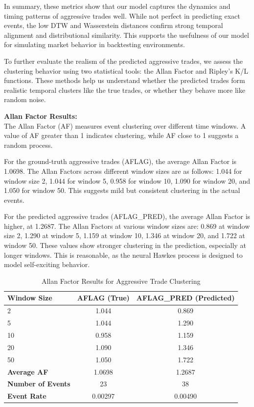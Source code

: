 In summary, these metrics show that our model captures the dynamics and timing patterns of aggressive trades well. While not perfect in predicting exact events, the low DTW and Wasserstein distances confirm strong temporal alignment and distributional similarity. This supports the usefulness of our model for simulating market behavior in backtesting environments.



To further evaluate the realism of the predicted aggressive trades, we assess the clustering behavior using two statistical tools: the Allan Factor and Ripley's K/L functions. These methods help us understand whether the predicted trades form realistic temporal clusters like the true trades, or whether they behave more like random noise.

\noindent\textbf{Allan Factor Results:} \\
The Allan Factor (AF) measures event clustering over different time windows. A value of AF greater than 1 indicates clustering, while AF close to 1 suggests a random process.

For the ground-truth aggressive trades (AFLAG), the average Allan Factor is 1.0698. The Allan Factors across different window sizes are as follows: 1.044 for window size 2, 1.044 for window 5, 0.958 for window 10, 1.090 for window 20, and 1.050 for window 50. This suggests mild but consistent clustering in the actual events.

For the predicted aggressive trades (AFLAG\_PRED), the average Allan Factor is higher, at 1.2687. The Allan Factors at various window sizes are: 0.869 at window size 2, 1.290 at window 5, 1.159 at window 10, 1.346 at window 20, and 1.722 at window 50. These values show stronger clustering in the prediction, especially at longer windows. This is reasonable, as the neural Hawkes process is designed to model self-exciting behavior.
\begin{table}[H]
    \centering
    \caption{Allan Factor Results for Aggressive Trade Clustering}
    \label{tb:allan-factor}
    \begin{tabular}{lcc}
    \toprule
    \textbf{Window Size} & \textbf{AFLAG (True)} & \textbf{AFLAG\_PRED (Predicted)} \\
    \midrule
    2   & 1.044 & 0.869 \\
    5   & 1.044 & 1.290 \\
    10  & 0.958 & 1.159 \\
    20  & 1.090 & 1.346 \\
    50  & 1.050 & 1.722 \\
    \midrule
    \textbf{Average AF} & 1.0698 & 1.2687 \\
    \textbf{Number of Events} & 23 & 38 \\
    \textbf{Event Rate} & 0.00297 & 0.00490 \\
    \bottomrule
    \end{tabular}
\end{table}

